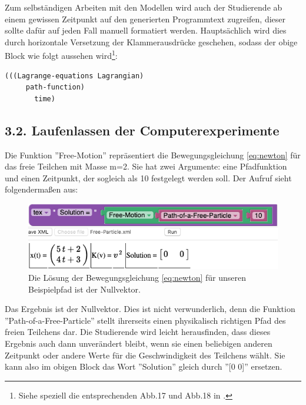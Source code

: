 \documentclass[twocolumn, 10pt]{article}
\begin{document}
Zum selbständigen Arbeiten mit den Modellen wird auch der Studierende ab einem gewissen Zeitpunkt auf den generierten Programmtext zugreifen, dieser sollte dafür auf jeden Fall manuell formatiert werden. Hauptsächlich wird dies durch horizontale Versetzung der Klammerausdrücke geschehen, sodass der obige Block wie folgt aussehen wird\footnote{Siehe speziell die entsprechenden Abb.17 und Abb.18 in \cite{cConversy 13}.}:

\begin{lstlisting}
(((Lagrange-equations Lagrangian)
     path-function)
       time)
\end{lstlisting}

\subsection{3.2.	Laufenlassen der Computerexperimente}

Die Funktion ''Free-Motion'' repräsentiert die Bewegungsgleichung \ref{eq:newton} für das freie Teilchen mit Masse m=2. Sie hat zwei Argumente: eine Pfadfunktion und einen Zeitpunkt, der sogleich als 10 festgelegt werden soll. Der Aufruf sieht folgendermaßen aus:

\begin{figure}[H]
\includegraphics[scale=0.4]{bilder/session_41.png}
\caption{Die Lösung der Bewegungsgleichung \ref{eq:newton} für unseren Beispielpfad ist der Nullvektor.}
\label{fig:session41}
\end{figure}

Das Ergebnis ist der Nullvektor. Dies ist nicht verwunderlich, denn die Funktion ''Path-of-a-Free-Particle'' stellt ihrerseits einen physikalisch richtigen Pfad des freien Teilchens dar. Die Studierende wird leicht herausfinden, dass dieses Ergebnis auch dann unverändert bleibt, wenn sie einen beliebigen anderen Zeitpunkt oder andere Werte für die Geschwindigkeit des Teilchens wählt. Sie kann also im obigen Block das Wort ''Solution'' gleich durch ''[0 0]'' ersetzen.
\end{document}
